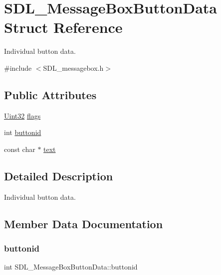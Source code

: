 \hypertarget{struct_s_d_l___message_box_button_data}{}\section{S\+D\+L\+\_\+\+Message\+Box\+Button\+Data Struct Reference}
\label{struct_s_d_l___message_box_button_data}


Individual button data.  




{\ttfamily \#include $<$S\+D\+L\+\_\+messagebox.\+h$>$}

\subsection*{Public Attributes}
\begin{DoxyCompactItemize}
\item 
\mbox{\hyperlink{_s_d_l__stdinc_8h_add440eff171ea5f55cb00c4a9ab8672d}{Uint32}} \mbox{\hyperlink{struct_s_d_l___message_box_button_data_a426c8b5da0e718242c7840706d95de0b}{flags}}
\item 
int \mbox{\hyperlink{struct_s_d_l___message_box_button_data_a22938886a6b13792006cc5c91fa38e92}{buttonid}}
\item 
const char $\ast$ \mbox{\hyperlink{struct_s_d_l___message_box_button_data_af35f3062f0577159284c8828caaf08e4}{text}}
\end{DoxyCompactItemize}


\subsection{Detailed Description}
Individual button data. 

\subsection{Member Data Documentation}
\mbox{\label{struct_s_d_l___message_box_button_data_a22938886a6b13792006cc5c91fa38e92}} 
\subsubsection{\texorpdfstring{buttonid}{buttonid}}
{\footnotesize\ttfamily int S\+D\+L\+\_\+\+Message\+Box\+Button\+Data\+::buttonid}

